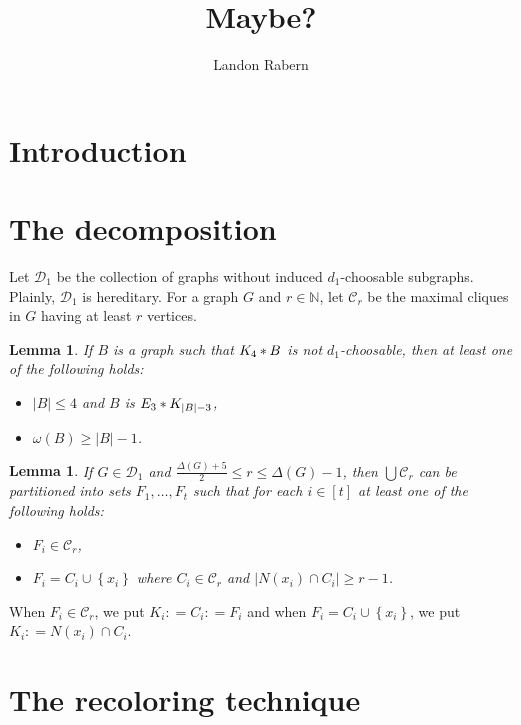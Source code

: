 \documentclass[12pt]{article}
\title{Maybe?}
\author{Landon Rabern}
\theoremstyle{plain}
\newtheorem{lem}[thm]{Lemma}
\theoremstyle{definition}
\theoremstyle{remark}
\newcommand{\fancy}[1]{\mathcal{#1}}
\newcommand{\C}[1]{\fancy{C}_{#1}}
\newcommand{\IN}{\mathbb{N}}
\newcommand{\set}[1]{\left\{ #1 \right\}}
\newcommand{\card}[1]{\left|#1\right|}
\newcommand{\irange}[1]{\left[#1\right]}
\newcommand{\join}[2]{#1 \mbox{\hspace{2 pt}$\ast$\hspace{2 pt}} #2}
\newcommand{\DefinedAs}{\mathrel{\mathop:}=}
\def\D{\fancy{D}}
\def\C{\fancy{C}}
\begin{document}
\maketitle

\section{Introduction}
\section{The decomposition}
Let $\D_1$ be the collection of graphs without induced $d_1$-choosable
subgraphs.  Plainly, $\D_1$ is hereditary.  For a graph $G$ and $r \in \IN$, let
$\C_r$ be the maximal cliques in $G$ having at least $r$ vertices.

\begin{lem}\label{CliqueJoin}
If $B$ is a graph such that $\join{K_4}{B}$ is not $d_1$-choosable, 
then at least one of the following holds:
\begin{itemize}
  \item $\card{B} \leq 4$ and $B$ is $\join{E_3}{K_{\card{B} - 3}}$,
  \item $\omega(B) \geq \card{B} - 1$.
\end{itemize}
\end{lem}


\begin{lem}\label{parition}
If $G \in \D_1$ and $\frac{\Delta(G) + 5}{2} \leq r \leq \Delta(G) - 1$, then
$\bigcup \C_r$ can be partitioned into sets $F_1, \ldots, F_t$ such that for
each $i \in \irange{t}$ at least one of the following holds:
\begin{itemize}
  \item $F_i \in \C_r$,
  \item $F_i = C_i \cup \set{x_i}$ where $C_i \in \C_r$ and $\card{N(x_i) \cap
  C_i} \geq r-1$.
\end{itemize}
\end{lem}

When $F_i \in \C_r$, we put $K_i \DefinedAs C_i \DefinedAs F_i$ and when $F_i =
C_i \cup \set{x_i}$, we put $K_i \DefinedAs N(x_i) \cap C_i$.

\section{The recoloring technique}
\end{document}
